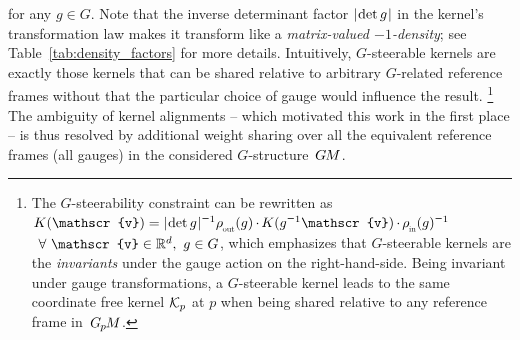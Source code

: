 for any $g\in G$.
Note that the inverse determinant factor $|\mkern-2mu \det g \mkern1mu|$ in the kernel's transformation law makes it transform like a \emph{matrix-valued $-1$-density}; see Table~\ref{tab:density_factors} for more details.
Intuitively, $G$-steerable kernels are exactly those kernels that can be shared relative to arbitrary $G$-related reference frames without that the particular choice of gauge would influence the result.%
\footnote{
    The $G$-steerability constraint can be rewritten as
    ${K(\mathscr{v}) = \detg^{\minus1} \rhoout(g) \mkern-1mu\cdot\mkern-1.5mu K(g^{\minus1}\mathscr{v}) \mkern-1mu\cdot\mkern-1.5mu \rhoin(g)^{\minus1}}$
    $\mkern8mu \forall\ \mathscr{v} \in \R^d,\ g\in G$,
    which emphasizes that $G$-steerable kernels are the \emph{invariants} under the gauge action on the right-hand-side.
    Being invariant under gauge transformations, a $G$-steerable kernel leads to the same coordinate free kernel $\mathcal{K}_p$ at $p$ when being shared relative to any reference frame in~$G_{\mkern-1.3mu p}\mkern-1.2muM$.
}
The ambiguity of kernel alignments -- which motivated this work in the first place -- is thus resolved by additional weight sharing over all the equivalent reference frames (all gauges) in the considered $G$-structure~$G\mkern-1.4muM$.


